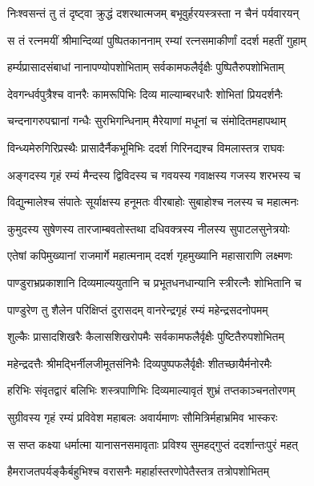 \twolineshloka
{निःश्वसन्तं तु तं दृष्ट्वा क्रुद्धं दशरथात्मजम्}
{बभूवुर्हरयस्त्रस्ता न चैनं पर्यवारयन्} %

\twolineshloka
{स तं रत्नमयीं श्रीमान्दिव्यां पुष्पितकाननाम्}
{रम्यां रत्नसमाकीर्णां ददर्श महतीं गुहाम्} %

\twolineshloka
{हर्म्यप्रासादसंबाधां नानापण्योपशोभिताम्}
{सर्वकामफलैर्वृक्षैः पुष्पितैरुपशोभिताम्} %

\twolineshloka
{देवगन्धर्वपुत्रैश्च वानरैः कामरूपिभिः}
{दिव्य माल्याम्बरधारैः शोभितां प्रियदर्शनैः} %

\twolineshloka
{चन्दनागरुपद्मानां गन्धैः सुरभिगन्धिनाम्}
{मैरेयाणां मधूनां च संमोदितमहापथाम्} %

\twolineshloka
{विन्ध्यमेरुगिरिप्रस्थैः प्रासादैर्नैकभूमिभिः}
{ददर्श गिरिनद्यश्च विमलास्तत्र राघवः} %

\twolineshloka
{अङ्गदस्य गृहं रम्यं मैन्दस्य द्विविदस्य च}
{गवयस्य गवाक्षस्य गजस्य शरभस्य च} %

\twolineshloka
{विद्युन्मालेश्च संपातेः सूर्याक्षस्य हनूमतः}
{वीरबाहोः सुबाहोश्च नलस्य च महात्मनः} %

\twolineshloka
{कुमुदस्य सुषेणस्य तारजाम्बवतोस्तथा}
{दधिवक्त्रस्य नीलस्य सुपाटलसुनेत्रयोः} %

\twolineshloka
{एतेषां कपिमुख्यानां राजमार्गे महात्मनाम्}
{ददर्श गृहमुख्यानि महासाराणि लक्ष्मणः} %

\twolineshloka
{पाण्डुराभ्रप्रकाशानि दिव्यमाल्ययुतानि च}
{प्रभूतधनधान्यानि स्त्रीरत्नैः शोभितानि च} %

\twolineshloka
{पाण्डुरेण तु शैलेन परिक्षिप्तं दुरासदम्}
{वानरेन्द्रगृहं रम्यं महेन्द्रसदनोपमम्} %

\twolineshloka
{शुल्कैः प्रासादशिखरैः कैलासशिखरोपमैः}
{सर्वकामफलैर्वृक्षैः पुष्टितैरुपशोभितम्} %

\twolineshloka
{महेन्द्रदत्तैः श्रीमद्भिर्नीलजीमूतसंनिभैः}
{दिव्यपुष्पफलैर्वृक्षैः शीतच्छायैर्मनोरमैः} %

\twolineshloka
{हरिभिः संवृतद्वारं बलिभिः शस्त्रपाणिभिः}
{दिव्यमाल्यावृतं शुभ्रं तप्तकाञ्चनतोरणम्} %

\twolineshloka
{सुग्रीवस्य गृहं रम्यं प्रविवेश महाबलः}
{अवार्यमाणः सौमित्रिर्महाभ्रमिव भास्करः} %

\twolineshloka
{स सप्त कक्ष्या धर्मात्मा यानासनसमावृताः}
{प्रविश्य सुमहद्गुप्तं ददर्शान्तःपुरं महत्} %

\twolineshloka
{हैमराजतपर्यङ्कैर्बहुभिश्च वरासनैः}
{महार्हास्तरणोपेतैस्तत्र तत्रोपशोभितम्} %

